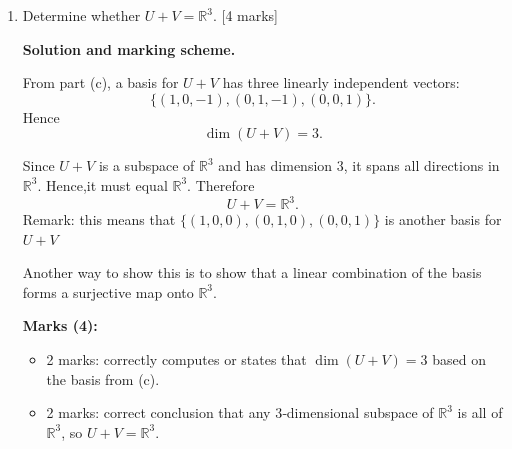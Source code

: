 \documentclass{article}
\begin{document}
\begin{enumerate}[label=(\alph*)]
\begin{mdframed}[linecolor=black, linewidth=1pt]
    \textbf{Marks (8):}
    \begin{itemize}
      \item 2 marks: correct basis for $U$, e.g.\ $\{(1,0,-1),(0,1,-1)\}$, with justification.
      \item 2 marks: correct basis for $V$, e.g.\ $\{(1,1,0),(0,0,1)\}$, with justification.
      \item 3 mark: form $S = B_U\cup B_V$ and observe redundancy (e.g.\ express $(1,1,0)$ as combination of the others).
      \item 1 mark: state a correct basis for $U+V$, e.g.\ $\{(1,0,-1),(0,1,-1),(0,0,1)\}$, and note linear independence.
    \end{itemize}
    \end{mdframed}
    
    \item Determine whether $U+V = \mathbb{R}^3$. [4 marks]

    \begin{mdframed}[linecolor=black, linewidth=1pt]
    \textbf{Solution and marking scheme.}

    From part (c), a basis for $U+V$ has three linearly independent vectors:
    \[
    \{(1,0,-1),(0,1,-1),(0,0,1)\}.
    \]
    Hence
    \[
    \dim(U+V) = 3.
    \]
    
    Since $U+V$ is a subspace of $\mathbb{R}^3$ and has dimension $3$, it spans all directions in $\mathbb{R}^3$. Hence,it must equal $\mathbb{R}^3$. Therefore
    \[
    U+V = \mathbb{R}^3.
    \]
    Remark: this means that $\{(1,0,0),(0,1,0),(0,0,1)\}$ is another basis for $U+V$

    Another way to show this is to show that a linear combination of the basis forms a surjective map onto $\mathbb{R}^3$.
    
    \textbf{Marks (4):}
    \begin{itemize}
      \item 2 marks: correctly computes or states that $\dim(U+V)=3$ based on the basis from (c).
      \item 2 marks: correct conclusion that any $3$‑dimensional subspace of $\mathbb{R}^3$ is all of $\mathbb{R}^3$, so $U+V=\mathbb{R}^3$.
    \end{itemize}
    \end{mdframed}
    
\end{enumerate}

\bigskip

\end{document}
